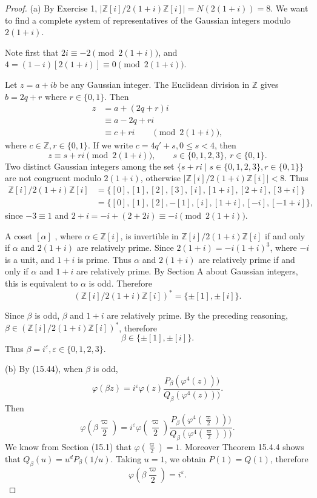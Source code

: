 \documentclass[11pt,a4paper]{article}
\newcommand{\Z}{\mathbb{Z}}
\begin{document}
\begin{proof} 
\item[(a)] By Exercise 1, $|\Z[i]/2(1+i)\Z[i]| = N(2(1+i)) = 8$.
We want to find a complete system of representatives of the Gaussian integers modulo $2(1+i)$. 

Note first that $2i \equiv -2 \pmod{2(1+i)}$, and $4 = (1-i)[2(1+i)] \equiv 0 \pmod{2(1+i)}$. 

Let $z = a+ib$ be any Gaussian integer. The Euclidean division in $\Z$ gives  $b = 2q +r$ where $r \in \{0,1\}$. Then
\begin{align*}
z  &= a+ (2q + r)i\\
&\equiv a- 2q +ri\\
&\equiv c+ri \qquad \pmod {2(1+i)},
\end{align*}
where $c \in \Z, r \in \{0,1\}$. If we write $c = 4q' +s, 0\leq s <4$, then 
$$z \equiv s +ri \pmod{2(1+i)}, \qquad s \in \{0,1,2,3\},\  r\in \{0,1\}.$$
Two distinct  Gaussian integers among the set $\{s +ri \mid s \in \{0,1,2,3\}, r\in \{0,1\}\}$ are not congruent modulo $2(1+i)$, otherwise $|\Z[i]/2(1+i)\Z[i]| < 8$. Thus
\begin{align*}
\Z[i]/2(1+i)\Z[i] &= \{[0], [1],[2],[3], [i],[1+i],[2+i],[3+i]\}\\
&=\{[0],[1],[2],-[1],[i],[1+i],[-i],[-1+i]\},
\end{align*}
since $-3 \equiv 1$ and $2 + i = -i + (2+2i)  \equiv -i \pmod{2(1+i)}$.

A coset $[\alpha]$ , where $\alpha \in \Z[i]$, is invertible in $\Z[i]/2(1+i)\Z[i] $ if and only if $\alpha$ and $2(1+i)$ are relatively prime. Since $2(1+i) = -i(1+i)^3$, where $-i$ is a unit, and $1+i$ is prime. Thus  $\alpha$ and $2(1+i)$ are relatively prime if and only if $\alpha$ and $1+i$ are relatively prime. By Section A about Gaussian integers, this is equivalent to $\alpha$ is odd. Therefore
$$\left(\Z[i]/2(1+i)\Z[i]\right)^* = \{\pm[1],\pm[i]\}.$$

Since $\beta$ is odd, $\beta$ and $1+i$ are relatively prime. By the preceding reasoning, $\beta \in \left(\Z[i]/2(1+i)\Z[i]\right)^*$, therefore
$$\beta \in \{\pm[1],\pm[i]\}.$$
Thus $\beta = i^\varepsilon, \varepsilon \in\{0,1,2,3\}$.

\item[(b)] By (15.44), when $\beta$ is odd,
$$\varphi(\beta z) = i^\varepsilon \varphi(z) \frac{P_\beta\left(\varphi^4(z)\right))}{Q_\beta\left(\varphi^4(z)\right))}.$$
Then 
$$\varphi\left(\beta \frac{\varpi}{2}\right) = i^{\varepsilon} \varphi\left(\frac{\varpi}{2}\right)  \frac{P_\beta\left(\varphi^4(\frac{\varpi}{2})\right))}{Q_\beta\left(\varphi^4(\frac{\varpi}{2})\right))}.$$
We know from Section (15.1) that $\varphi\left(\frac{\varpi}{2}\right) =1$. Moreover Theorem 15.4.4 shows that $Q_\beta(u) = u^dP_\beta(1/u)$. Taking $u=1$, we obtain $P(1) = Q(1)$, therefore
$$\varphi\left(\beta \frac{\varpi}{2}\right) = i^{\varepsilon}.$$
\end{proof}
\end{document}
